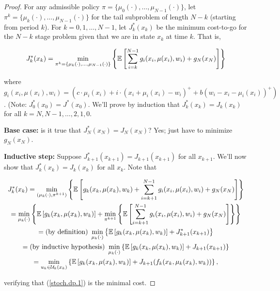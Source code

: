 \begin{proof}

For any admissible policy \(\pi = \{ \mu_0(\cdot), \ldots, \mu_{N-1}(\cdot)\}\), let \(\pi^k =  \{ \mu_k(\cdot), \ldots, \mu_{N-1}(\cdot)\}\) for the tail subproblem of length \(N-k\) (starting from period \(k\)). For \(k = 0, 1, \ldots, N-1\), let \(J_k^*(x_k)\) be the minimum cost-to-go for the \(N-k\) stage problem given that we are in state \(x_k\) at time \(k\). That is,

\[
J_k^*(x_k) = \min_{\pi^k =  \{ \mu_k(\cdot), \ldots, \mu_{N-1}(\cdot)\}}  \left\{ \mathbb{E} \left[ \sum_{i=k}^{N-1}g_i(x_i, \mu(x_i), w_i) + g_N(x_N) \right] \right\}
\]

where \(g_i(x_i, \mu(x_i), w_i) =  \left( c \cdot \mu_i(x_i) +  i \cdot (x_i +  \mu_i(x_i) - w_i)^+ + b(w_i - x_i -  \mu_i(x_i))^+ \right) \). (Note: \(J_0^*(x_0) = J^*(x_0)\). We'll prove by induction that \(J_k^*(x_k) = J_k(x_k)\) for all \(k = N, N-1, \ldots, 2, 1, 0\). 

\textbf{Base case:} is it true that \(J_N^*(x_N) = J_N(x_N)\)? Yes; just have to minimize \(g_N(x_N)\). 

\textbf{Inductive step:} Suppose \(J_{k+1}^*(x_{k+1}) = J_{k+1}(x_{k+1})\) for all \(x_{k+1}\). We'll now show that \(J_{k}^*(x_{k}) = J_{k}(x_{k})\) for all \(x_k\). Note that 

\begin{multline*}
J_k^*(x_k) = \min_{(\mu_k(\cdot), \pi^{k+1})}  \left\{ \mathbb{E} \left[ g_k(x_k, \mu(x_k), w_k) +  \sum_{i=k+1}^{N-1}g_i(x_i, \mu(x_i), w_i)  + g_N(x_N) \right] \right\}
\\ = \min_{\mu_k(\cdot)}   \left\{ \mathbb{E} \left[ g_k(x_k, \mu(x_k), w_k) \right] +  \min_{ \pi^{k+1}}\left\{\mathbb{E} \left[ \sum_{i=k+1}^{N-1}g_i(x_i, \mu(x_i), w_i)  + g_N(x_N)  \right] \right\} \right\}
\\ = \text{(by definition) } \min_{\mu_k(\cdot)}   \left\{ \mathbb{E} \left[ g_k(x_k, \mu(x_k), w_k) \right] +  J_{k+1}^*(x_{k+1}) \right\} 
\\ = \text{(by inductive hypothesis) } \min_{\mu_k(\cdot)}   \left\{ \mathbb{E} \left[ g_k(x_k, \mu(x_k), w_k) \right] +  J_{k+1}(x_{k+1}) \right\} 
\\ = \underset{u_{k} \in \mathcal{U}_k(x_k)}{\min}  \left\{ \mathbb{E} \left[ g_k(x_k, \mu(x_k), w_k) \right] +  J_{k+1}(f_k(x_k, \mu_k(x_k), w_k)) \right\} ,
\end{multline*}

verifying that (\ref{stoch.dp.1}) is the minimal cost.

\end{proof}

